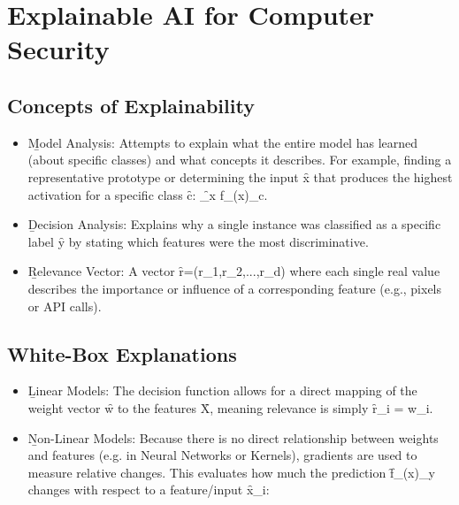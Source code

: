 \section{Explainable AI for Computer Security}

\subsection{Concepts of Explainability}


\begin{itemize}
\item \b{Model Analysis}: Attempts to explain what the entire model has learned (about specific classes) and what concepts it describes. For example, finding a representative prototype or determining the input \f{x} that produces the highest activation for a specific class \f{c}: \f{\arg \max_{x} f_{\theta}(x)_{c}}.
\item \b{Decision Analysis}: Explains why a single instance was classified as a specific label \f{y} by stating which features were the most discriminative.
\item \b{Relevance Vector}: A vector \f{r=(r_{1},r_{2},...,r_{d})} where each single real value describes the importance or influence of a corresponding feature (e.g., pixels or API calls).
\end{itemize}




\subsection{White-Box Explanations}


\begin{itemize}
\item \b{Linear Models}: The decision function allows for a direct mapping of the weight vector \f{w} to the features \f{X}, meaning relevance is simply \f{r_i = w_i}.
\item \b{Non-Linear Models}: Because there is no direct relationship between weights and features (e.g. in Neural Networks or Kernels), gradients are used to measure relative changes. This evaluates how much the prediction \f{f_\theta(x)_y} changes with respect to a feature/input \f{x_i}: 
\end{itemize}

